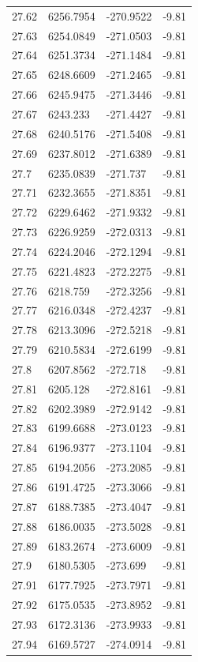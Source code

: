 \begin{table}[H]
\begin{tabular}{llll}
27.62 & 6256.7954 & -270.9522 & -9.81 \\
27.63 & 6254.0849 & -271.0503 & -9.81 \\
27.64 & 6251.3734 & -271.1484 & -9.81 \\
27.65 & 6248.6609 & -271.2465 & -9.81 \\
27.66 & 6245.9475 & -271.3446 & -9.81 \\
27.67 & 6243.233 & -271.4427 & -9.81 \\
27.68 & 6240.5176 & -271.5408 & -9.81 \\
27.69 & 6237.8012 & -271.6389 & -9.81 \\
27.7 & 6235.0839 & -271.737 & -9.81 \\
27.71 & 6232.3655 & -271.8351 & -9.81 \\
27.72 & 6229.6462 & -271.9332 & -9.81 \\
27.73 & 6226.9259 & -272.0313 & -9.81 \\
27.74 & 6224.2046 & -272.1294 & -9.81 \\
27.75 & 6221.4823 & -272.2275 & -9.81 \\
27.76 & 6218.759 & -272.3256 & -9.81 \\
27.77 & 6216.0348 & -272.4237 & -9.81 \\
27.78 & 6213.3096 & -272.5218 & -9.81 \\
27.79 & 6210.5834 & -272.6199 & -9.81 \\
27.8 & 6207.8562 & -272.718 & -9.81 \\
27.81 & 6205.128 & -272.8161 & -9.81 \\
27.82 & 6202.3989 & -272.9142 & -9.81 \\
27.83 & 6199.6688 & -273.0123 & -9.81 \\
27.84 & 6196.9377 & -273.1104 & -9.81 \\
27.85 & 6194.2056 & -273.2085 & -9.81 \\
27.86 & 6191.4725 & -273.3066 & -9.81 \\
27.87 & 6188.7385 & -273.4047 & -9.81 \\
27.88 & 6186.0035 & -273.5028 & -9.81 \\
27.89 & 6183.2674 & -273.6009 & -9.81 \\
27.9 & 6180.5305 & -273.699 & -9.81 \\
27.91 & 6177.7925 & -273.7971 & -9.81 \\
27.92 & 6175.0535 & -273.8952 & -9.81 \\
27.93 & 6172.3136 & -273.9933 & -9.81 \\
27.94 & 6169.5727 & -274.0914 & -9.81 \\

\end{tabular}
\end{table}
